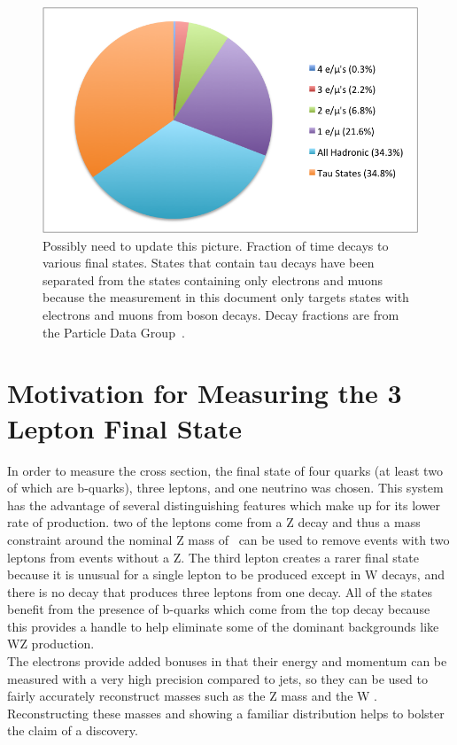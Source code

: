 	\begin{figure}[h]
\begin{center}
\includegraphics[width=0.8\linewidth]{Figs/ttZ_decay_fraction.png}
\caption{\label{fig:ttZ_decay_rates}
Possibly need to update this picture. Fraction of time \ttZ decays to various final states. States that contain tau decays have been separated from the states containing only electrons and muons because the measurement in this document only targets states with electrons and muons from boson decays. Decay fractions are from the Particle Data Group~\cite{pdg}.
}
\end{center}
\end{figure} 

	
	\section{Motivation for Measuring the 3 Lepton Final State}
	In order to measure the \ttZ cross section, the final state of four quarks (at least two of which are b-quarks), three leptons, and one neutrino was chosen. This system has the advantage of several distinguishing features which make up for its lower rate of production. two of the leptons come from a Z decay and thus a mass constraint around the nominal Z mass of \zmass \ can be used to remove events with two leptons from events without a Z. The third lepton creates a rarer final state because it is unusual for a single lepton to be produced except in W decays, and there is no decay that produces three leptons from one decay. All of the states benefit from the presence of b-quarks which come from the top decay because this provides a handle to help eliminate some of the dominant backgrounds like WZ production.\\
	
	The electrons provide added bonuses in that their energy and momentum can be measured with a very high precision compared to jets, so they can be used to fairly accurately reconstruct masses such as the Z mass and the W \mt. Reconstructing these masses and showing a familiar distribution helps to bolster the claim of a \ttZ discovery. 